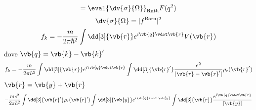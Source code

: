 \begin{soluzione}
{\begin{equation*}
      =\eval{\dv{\sigma}{\Omega}}_{\rm Ruth} F(q^2)
   \end{equation*}
   \begin{equation*}
      \dv{\sigma}{\Omega}
      =|f^{\rm Born}|^2
   \end{equation*}
   \begin{equation*}
      f_k
      =-\frac{m}{2 \pi \hbar^2} \int \dd[3]{\vb{r}} e^{i \vb{q} \vdot \vb{r}} V(\vb{r})
   \end{equation*}
   dove $\vb{q}=\vb{k} - \vb{k}'$
   \begin{equation*}
      f_k
      =-\frac{m}{2 \pi \hbar^2} \int \dd[3]{\vb{r}} e^{i \vb{q} \vdot \vb{r}} \int \dd[3]{\vb{r}'} \frac{e^2}{| \vb{r} - \vb{r}' |} \rho_e(\vb{r}')
   \end{equation*}
   $\vb{r}=\vb{y} + \vb{r}$
   \begin{equation*}
      -\frac{m e^2}{2 \pi \hbar^2} \int \dd[3]{\vb{r}'} \rho_e(\vb{r}') \int \dd[3]{\vb{y}} e^{i \vb{q} \vdot \vb{y}} \int \dd[3]{\vb{r}} \frac{e^{i \vb{q} \vdot \vb{r}}}{| \vb{y} |}
   \end{equation*}
   }
\end{soluzione}

\newpage
\setcounter{equation}{0}


